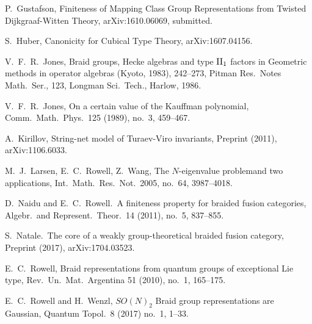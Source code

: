 \documentclass[12pt]{article}
\theoremstyle{definition}
\begin{document}
\begin{thebibliography}{0}
          
 P.\ Gustafson, {Finiteness of Mapping Class Group Representations from Twisted Dijkgraaf-Witten Theory}, arXiv:1610.06069, submitted.

  S.\ Huber, Canonicity for Cubical Type Theory, arXiv:1607.04156.

   
 V.\ F.\ R.\ Jones, {Braid groups, Hecke algebras and type ${\rm II}\sb 1$ factors} in Geometric methods in operator algebras (Kyoto, 1983), 242--273, Pitman Res.\ Notes Math.\ Ser., 123, Longman Sci.\ Tech., Harlow, 1986.

 V.\ F.\ R.\ Jones, {On a certain value of the Kauffman polynomial}, Comm.\ Math.\ Phys.\ {125} (1989), no.\ 3, 459--467.

   A.\ Kirillov, {String-net model of {Turaev-Viro} invariants}, Preprint (2011), arXiv:1106.6033.
  
 M.\ J.\ Larsen, E.\ C.\ Rowell, Z.\ Wang, {The $N$-eigenvalue problemand two applications}, Int.\ Math.\ Res.\ Not.\  2005,  no.\ 64, 3987--4018. 
    
 D.\ Naidu and E.\ C.\ Rowell.\ A finiteness property for braided fusion categories, Algebr.\ and Represent.\ Theor.\ {14} (2011), no.\ 5, 837--855.

 S.\ Natale.\ The core of a weakly group-theoretical braided fusion category, Preprint (2017), arXiv:1704.03523.

  E.\ C.\ Rowell, Braid representations from quantum groups of exceptional Lie type, Rev.\ Un.\ Mat.\ Argentina {51} (2010), no.\ 1, 165--175.

    E.\ C.\ Rowell and H.\ Wenzl, $SO(N)_2$ Braid group representations are Gaussian, Quantum Topol.\ {8} (2017) no.\ 1, 1--33.
    
\end{thebibliography}
\end{document}
